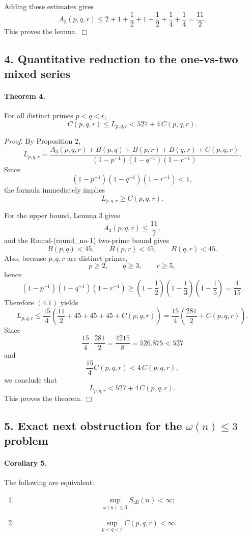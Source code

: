 Adding these estimates gives
\[
A_3(p,q,r)
\le
2+1+\frac12+1+\frac12+\frac14+\frac14
=
\frac{11}{2}.
\]
This proves the lemma.
\hfill\(\Box\)

\subsection*{4. Quantitative reduction to the one-vs-two mixed series}

\paragraph{Theorem 4.}
For all distinct primes \(p<q<r\),
\[
C(p,q,r)\le L_{p,q,r}<527+4\,C(p,q,r).
\]

\emph{Proof.}
By Proposition 2,
\[
L_{p,q,r}
=
\frac{
A_3(p,q,r)+B(p,q)+B(p,r)+B(q,r)+C(p,q,r)
}{
(1-p^{-1})(1-q^{-1})(1-r^{-1})
}.
\tag{4.1}
\]
Since
\[
(1-p^{-1})(1-q^{-1})(1-r^{-1})<1,
\]
the formula immediately implies
\[
L_{p,q,r}\ge C(p,q,r).
\]

For the upper bound, Lemma 3 gives
\[
A_3(p,q,r)\le \frac{11}{2},
\]
and the Round-(round\_no-1) two-prime bound gives
\[
B(p,q)<45,\qquad B(p,r)<45,\qquad B(q,r)<45.
\]
Also, because \(p,q,r\) are distinct primes,
\[
p\ge 2,\qquad q\ge 3,\qquad r\ge 5,
\]
hence
\[
(1-p^{-1})(1-q^{-1})(1-r^{-1})
\ge
\left(1-\frac12\right)\left(1-\frac13\right)\left(1-\frac15\right)
=
\frac{4}{15}.
\]
Therefore \((4.1)\) yields
\[
L_{p,q,r}
\le
\frac{15}{4}\left(\frac{11}{2}+45+45+45+C(p,q,r)\right)
=
\frac{15}{4}\left(\frac{281}{2}+C(p,q,r)\right).
\]
Since
\[
\frac{15}{4}\cdot \frac{281}{2}
=
\frac{4215}{8}
=
526.875<527
\]
and
\[
\frac{15}{4}C(p,q,r)<4\,C(p,q,r),
\]
we conclude that
\[
L_{p,q,r}<527+4\,C(p,q,r).
\]
This proves the theorem.
\hfill\(\Box\)

\subsection*{5. Exact next obstruction for the \(\omega(n)\le 3\) problem}

\paragraph{Corollary 5.}
The following are equivalent:
\begin{enumerate}
\item
\[
\sup_{\omega(n)\le 3} S_{\mathrm{all}}(n)<\infty;
\]
\item
\[
\sup_{p<q<r} C(p,q,r)<\infty.
\]
\end{enumerate}

